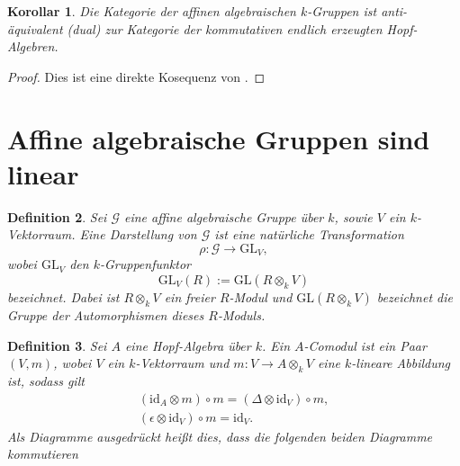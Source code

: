 \documentclass[a4paper, 11pt]{scrartcl}
\newcommand{\id}{\text{id}}
\theoremstyle{basicstyle}
\newtheorem{definition}{Definition}[section]
\newtheorem{korollar}[definition]{Korollar}
\begin{document}
    \begin{korollar}
        Die Kategorie der affinen algebraischen \(k\)-Gruppen ist anti-äquivalent (dual) zur Kategorie der kommutativen endlich erzeugten Hopf-Algebren.
    \end{korollar}
    \begin{proof}
        Dies ist eine direkte Kosequenz von .
    \end{proof}


    \section{Affine algebraische Gruppen sind linear}

    \begin{definition}
        Sei \(\mathcal{G}\) eine affine algebraische Gruppe über \(k\), sowie \(V\) ein \(k\)-Vektorraum.
        Eine \emph{Darstellung} von \(\mathcal{G}\) ist eine natürliche Transformation
        \[\rho : \mathcal{G} \longrightarrow \text{GL}_V,\]
        wobei \(\text{GL}_V\) den \(k\)-Gruppenfunktor
        \[\text{GL}_V(R) := \text{GL}(R \otimes_k V)\]
        bezeichnet.
        Dabei ist \(R \otimes_k V\) ein freier \(R\)-Modul und \(\text{GL}(R \otimes_k V)\) bezeichnet die Gruppe der Automorphismen dieses \(R\)-Moduls.
    \end{definition}

    \begin{definition}
        Sei \(A\) eine Hopf-Algebra über \(k\).
        Ein \emph{\(A\)-Comodul} ist ein Paar \((V, m)\), wobei \(V\) ein \(k\)-Vektorraum und \(m: V \to A \otimes_k V\) eine \(k\)-lineare Abbildung ist, sodass gilt %
        \begin{gather*}
            (\id_A \otimes m) \circ m = (\Delta \otimes \id_V) \circ m, \\
            (\epsilon \otimes \id_V) \circ m = \id_V.
        \end{gather*}
        Als Diagramme ausgedrückt heißt dies, dass die folgenden beiden Diagramme kommutieren
        \begin{figure*}[ht!]
            \centering
            \hspace*{4em}
        \end{figure*}
    \end{definition}
\end{document}
